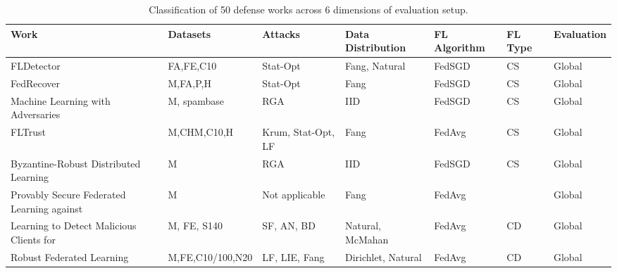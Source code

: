 \begin{table*}[]
\caption{Classification of 50 defense works across 6 dimensions of evaluation setup.}
\label{tab:defenses}
\scriptsize
\begin{tabular}{|l|p{2cm}|p{2.7cm}|l|p{1.5cm}|p{.7cm}|l|}
\hline
\textbf{Work}                                   & \textbf{Datasets}    & \textbf{Attacks}                 & \textbf{Data Distribution} & \textbf{FL Algorithm} & \textbf{FL Type} & \textbf{Evaluation} \\ \hline
FLDetector~\cite{zhang2022fldetector}                                      & FA,FE,C10            & Stat-Opt                             & Fang, Natural              & FedSGD                & CS               & Global              \\ \hline
FedRecover   ~\cite{cao2022fedrecover}                                   & M,FA,P,H             & Stat-Opt                             & Fang                       & FedSGD                & CS               & Global              \\ \hline
Machine Learning with Adversaries~\cite{blanchard2017machine}               & M, spambase          & RGA                              & IID                        & FedSGD                & CS               & Global              \\ \hline
FLTrust~\cite{cao2020fltrust}                                         & M,CHM,C10,H          & Krum, Stat-Opt, LF                   & Fang                       & FedAvg                & CS               & Global              \\ \hline
Byzantine-Robust Distributed Learning~\cite{yin2018byzantine}           & M                    & RGA                              & IID                        & FedSGD                & CS               & Global              \\ \hline
Provably Secure Federated Learning against~\cite{cao2021provably}      & M                    & Not applicable                   & Fang                       & FedAvg                &                  & Global              \\ \hline
Learning to Detect Malicious Clients for~\cite{li2020learning}        & M, FE, S140          & SF, AN, BD                       & Natural, McMahan           & FedAvg                & CD               & Global              \\ \hline
Robust Federated Learning~\cite{xie2022robust}                       & M,FE,C10/100,N20     & LF, LIE, Fang                    & Dirichlet, Natural         & FedAvg                & CD               & Global              \\ \hline

\end{tabular}
\end{table*}
